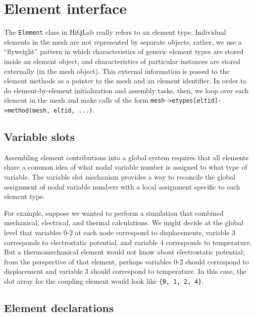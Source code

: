 \section{Element interface}

The {\tt Element} class in HiQLab really refers to an element
type.  Individual elements in the mesh are not represented by
separate objects; rather, we use a ``flyweight'' pattern in which
characteristics of generic element types are stored inside an
element object, and characteristics of particular instances are
stored externally (in the mesh object).  This external information
is passed to the element methods as a pointer to the mesh and an
element identifier.  In order to do element-by-element
initialization and assembly tasks, then, we loop over each element
in the mesh and make calls of the form
{\tt mesh->etypes[eltid]->method(mesh, eltid, ...)}.

\subsection{Variable slots}

Assembling element contributions into a global system requires that
all elements share a common idea of what nodal variable number is
assigned to what type of variable.  The variable slot mechanism
provides a way to reconcile the global assignment of nodal variable
numbers with a local assignment specific to each element type.

For example, suppose we wanted to perform a simulation that
combined mechanical, electrical, and thermal calculations.  We
might decide at the global level that variables 0-2 at each node
correspond to displacements, variable 3 corresponds to
electrostatic potential, and variable 4 corresponds to temperature.
But a thermomechanical element would not know about electrostatic
potential; from the perspective of that element, perhaps variables
0-2 should correspond to displacement and variable 3 should
correspond to temperature.  In this case, the slot array for the
coupling element would look like {\tt \{0, 1, 2, 4\}}.

\subsection{Element declarations}

